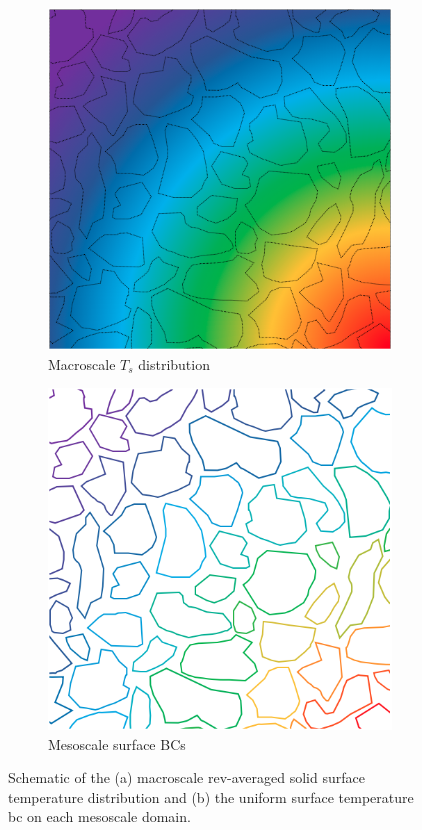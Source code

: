 \begin{figure}[!h]
\centering
\begin{subfigure}{.485\textwidth}
  \centering
  \includegraphics[width=0.8\linewidth]{figs/macro.png}
  \caption{Macroscale \(T_s\) distribution}
  \label{fig:mesoa}
\end{subfigure}
\begin{subfigure}{.485\textwidth}
  \centering
  \includegraphics[width=0.8\linewidth]{figs/meso.png}
  \caption{Mesoscale surface BCs}
  \label{fig:mesob}
\end{subfigure}
\caption{Schematic of the (a) macroscale \gls{rev}-averaged solid surface temperature distribution and (b) the uniform surface temperature \gls{bc} on each mesoscale domain.}
\label{fig:meso}
\end{figure}

